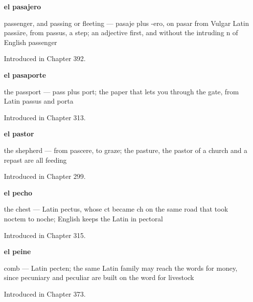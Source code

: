 \noindent\begin{minipage}[t]{\linewidth}
\raggedright
\textbf{el pasajero}\par
\small passenger, and passing or fleeting — pasaje plus -ero, on pasar from Vulgar Latin passāre, from passus, a step; an adjective first, and without the intruding n of English passenger\par
\footnotesize Introduced in Chapter 392.
\end{minipage}\par\medskip

\noindent\begin{minipage}[t]{\linewidth}
\raggedright
\textbf{el pasaporte}\par
\small the passport — pass plus port; the paper that lets you through the gate, from Latin passus and porta\par
\footnotesize Introduced in Chapter 313.
\end{minipage}\par\medskip

\noindent\begin{minipage}[t]{\linewidth}
\raggedright
\textbf{el pastor}\par
\small the shepherd — from pascere, to graze; the pasture, the pastor of a church and a repast are all feeding\par
\footnotesize Introduced in Chapter 299.
\end{minipage}\par\medskip

\noindent\begin{minipage}[t]{\linewidth}
\raggedright
\textbf{el pecho}\par
\small the chest — Latin pectus, whose ct became ch on the same road that took noctem to noche; English keeps the Latin in pectoral\par
\footnotesize Introduced in Chapter 315.
\end{minipage}\par\medskip

\noindent\begin{minipage}[t]{\linewidth}
\raggedright
\textbf{el peine}\par
\small comb — Latin pecten; the same Latin family may reach the words for money, since pecuniary and peculiar are built on the word for livestock\par
\footnotesize Introduced in Chapter 373.
\end{minipage}\par\medskip

